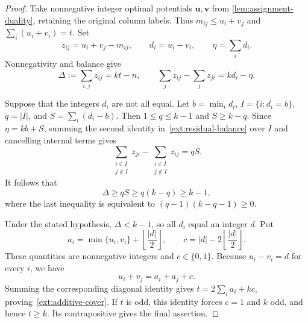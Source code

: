 \documentclass[11pt,reqno]{amsart}
\numberwithin{equation}{section}
\theoremstyle{definition}
\theoremstyle{remark}
\begin{document}
\begin{proof}
Take nonnegative integer optimal potentials $\mathbf u,\mathbf v$
from \cref{lem:assignment-duality}, retaining the original column
labels. Thus $m_{ij}\le u_i+v_j$ and $\sum_i(u_i+v_i)=t$.
Set
\[
 z_{ij}=u_i+v_j-m_{ij},\qquad
 d_i=u_i-v_i,\qquad \eta=\sum_i d_i.
\]
Nonnegativity and balance give
\begin{equation}
\label{ext:residual-balance}
 \Delta:=\sum_{i,j}z_{ij}=kt-n,
 \qquad
 \sum_jz_{ij}-\sum_jz_{ji}=kd_i-\eta.
\end{equation}

Suppose that the integers $d_i$ are not all equal. Let
$b=\min_i d_i$, $I=\{i:d_i=b\}$, $q=|I|$, and
$S=\sum_i(d_i-b)$. Then $1\le q\le k-1$ and $S\ge k-q$.
Since $\eta=kb+S$, summing the second identity
in~\eqref{ext:residual-balance} over $I$ and cancelling internal
terms gives
\[
 \sum_{\substack{i\in I\\j\notin I}}z_{ji}
 -\sum_{\substack{i\in I\\j\notin I}}z_{ij}=qS.
\]
It follows that
\[
 \Delta\ge qS\ge q(k-q)\ge k-1,
\]
where the last inequality is equivalent to
$(q-1)(k-q-1)\ge0$.

Under the stated hypothesis, $\Delta<k-1$, so all $d_i$ equal an
integer $d$. Put
\[
 a_i=\min\{u_i,v_i\}+\left\lfloor\frac{|d|}{2}\right\rfloor,
 \qquad c=|d|-2\left\lfloor\frac{|d|}{2}\right\rfloor.
\]
These quantities are nonnegative integers and $c\in\{0,1\}$.
Because $u_i-v_i=d$ for every $i$, we have
\[
 u_i+v_j=a_i+a_j+c.
\]
Summing the corresponding diagonal identity gives
$t=2\sum_i a_i+kc$, proving~\eqref{ext:additive-cover}.
If $t$ is odd, this identity forces $c=1$ and $k$ odd, and hence
$t\ge k$. Its contrapositive gives the final assertion.
\end{proof}
\end{document}
